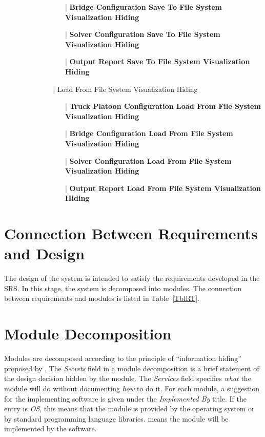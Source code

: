 \documentclass[12pt, titlepage]{article}
\begin{document}
\begin{enumerate}
\begin{enumerate}
\begin{enumerate}
\begin{itemize}
\begin{itemize}
                    \item[|] \textbf{Bridge Configuration Save To File System Visualization Hiding}
                    \item[|] \textbf{Solver Configuration Save To File System Visualization Hiding}
                    \item[|] \textbf{Output Report Save To File System Visualization Hiding}
                \end{itemize}
                \item[|] {Load From File System Visualization Hiding}
                \begin{itemize}
                    \item[|] \textbf{Truck Platoon Configuration Load From File System Visualization Hiding}
                    \item[|] \textbf{Bridge Configuration Load From File System Visualization Hiding}
                    \item[|] \textbf{Solver Configuration Load From File System Visualization Hiding}
                    \item[|] \textbf{Output Report Load From File System Visualization Hiding}
                \end{itemize}
            \end{itemize}
        \end{enumerate}
    \end{enumerate}
\end{enumerate}

\section{Connection Between Requirements and Design} \label{SecConnection}

The design of the system is intended to satisfy the requirements developed in
the SRS. In this stage, the system is decomposed into modules. The connection
between requirements and modules is listed in Table~\ref{TblRT}.

\section{Module Decomposition} \label{SecMD}

Modules are decomposed according to the principle of ``information hiding''
proposed by \citet{ParnasEtAl1984}. The \emph{Secrets} field in a module
decomposition is a brief statement of the design decision hidden by the
module. The \emph{Services} field specifies \emph{what} the module will do
without documenting \emph{how} to do it. For each module, a suggestion for the
implementing software is given under the \emph{Implemented By} title. If the
entry is \emph{OS}, this means that the module is provided by the operating
system or by standard programming language libraries.  \emph{\progname{}} means the
module will be implemented by the \progname{} software.
\end{document}
